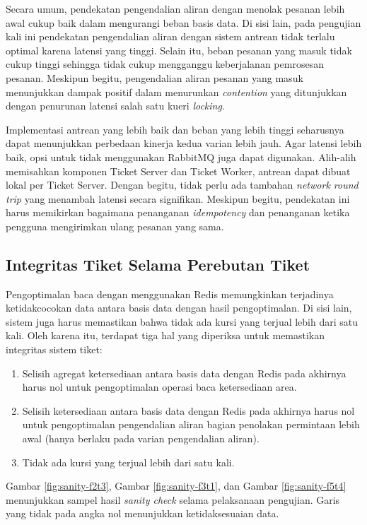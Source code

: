 Secara umum, pendekatan pengendalian aliran dengan menolak pesanan lebih awal cukup baik dalam mengurangi beban basis data. Di sisi lain, pada pengujian kali ini pendekatan pengendalian aliran dengan sistem antrean tidak terlalu optimal karena latensi yang tinggi. Selain itu, beban pesanan yang masuk tidak cukup tinggi sehingga tidak cukup mengganggu keberjalanan pemrosesan pesanan. Meskipun begitu, pengendalian aliran pesanan yang masuk menunjukkan dampak positif dalam menurunkan \textit{contention} yang ditunjukkan dengan penurunan latensi salah satu kueri \textit{locking}.

Implementasi antrean yang lebih baik dan beban yang lebih tinggi seharusnya dapat menunjukkan perbedaan kinerja kedua varian lebih jauh. Agar latensi lebih baik, opsi untuk tidak menggunakan RabbitMQ juga dapat digunakan. Alih-alih memisahkan komponen Ticket Server dan Ticket Worker, antrean dapat dibuat lokal per Ticket Server. Dengan begitu, tidak perlu ada tambahan \textit{network round trip} yang menambah latensi secara signifikan. Meskipun begitu, pendekatan ini harus memikirkan bagaimana penanganan \textit{idempotency} dan penanganan ketika pengguna mengirimkan ulang pesanan yang sama.

\subsection{Integritas Tiket Selama Perebutan Tiket}

Pengoptimalan baca dengan menggunakan Redis memungkinkan terjadinya ketidakcocokan data antara basis data dengan hasil pengoptimalan. Di sisi lain, sistem juga harus memastikan bahwa tidak ada kursi yang terjual lebih dari satu kali. Oleh karena itu, terdapat tiga hal yang diperiksa untuk memastikan integritas sistem tiket:

\begin{enumerate}
    \item Selisih agregat ketersediaan antara basis data dengan Redis pada akhirnya harus nol untuk pengoptimalan operasi baca ketersediaan area.
    \item Selisih ketersediaan antara basis data dengan Redis pada akhirnya harus nol untuk pengoptimalan pengendalian aliran bagian penolakan permintaan lebih awal (hanya berlaku pada varian pengendalian aliran).
    \item Tidak ada kursi yang terjual lebih dari satu kali.
\end{enumerate}

Gambar \ref{fig:sanity-f2t3}, Gambar \ref{fig:sanity-f3t1}, dan Gambar \ref{fig:sanity-f5t4} menunjukkan sampel hasil \textit{sanity check} selama pelaksanaan pengujian. Garis yang tidak pada angka nol menunjukkan ketidaksesuaian data.

